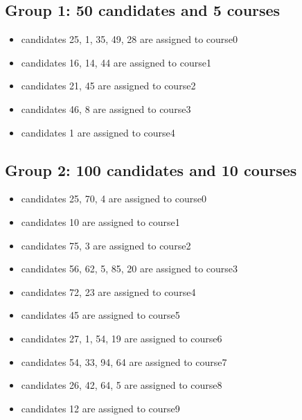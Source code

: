 \documentclass[twoside,twocolumn]{article}
\begin{document}
    \subsection{Group 1: 50 candidates and 5 courses}
    \begin{itemize}
        \item candidates 25, 1, 35, 49, 28 are assigned to course0
        \item candidates 16, 14, 44 are assigned to course1
        \item candidates 21, 45 are assigned to course2
        \item candidates 46, 8 are assigned to course3
        \item candidates 1 are assigned to course4
    \end{itemize}
    \subsection{Group 2: 100 candidates and 10 courses}
    \begin{itemize}
        \item candidates 25, 70, 4 are assigned to course0
        \item candidates 10 are assigned to course1
        \item candidates 75, 3 are assigned to course2
        \item candidates 56, 62, 5, 85, 20 are assigned to course3
        \item candidates 72, 23 are assigned to course4
        \item candidates 45 are assigned to course5
        \item candidates 27, 1, 54, 19 are assigned to course6
        \item candidates 54, 33, 94, 64 are assigned to course7
        \item candidates 26, 42, 64, 5 are assigned to course8
        \item candidates 12 are assigned to course9
    \end{itemize}
\end{document}
